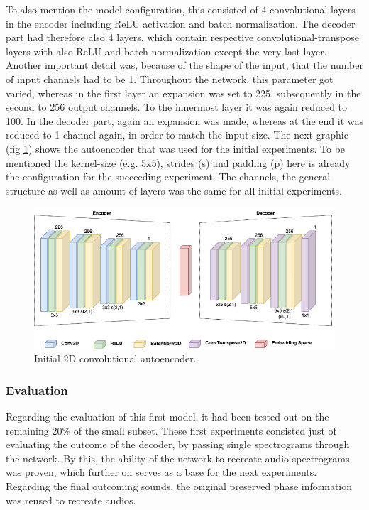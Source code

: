 To also mention the model configuration, this consisted of 4 convolutional layers in the encoder including ReLU activation and batch normalization. The decoder part had therefore also 4 layers, which contain respective convolutional-transpose layers with also ReLU and batch normalization except the very last layer. Another important detail was, because of the shape of the input, that the number of input channels had to be 1. Throughout the network, this parameter got varied, whereas in the first layer an expansion was set to 225, subsequently in the second to 256 output channels. To the innermost layer it was again reduced to 100. In the decoder part, again an expansion was made, whereas at the end it was reduced to 1 channel again, in order to match the input size. The next graphic (fig \ref{fig:cae_2D_init}) shows the autoencoder that was used for the initial experiments. To be mentioned the kernel-size (e.g. 5x5), strides (s) and padding (p) here is already the configuration for the succeeding experiment. The channels, the general structure as well as amount of layers was the same for all initial experiments.

 \begin{figure}[htb!]
	\caption{Initial 2D convolutional autoencoder.}
	\label{fig:cae_2D_init}
	\centering
	\includegraphics[width=\textwidth]{images/experiments/autoencoder_init.png}
\end{figure}

\newpage
\subsubsection{Evaluation}
Regarding the evaluation of this first model, it had been tested out on the remaining 20\% of the small subset. These first experiments consisted just of evaluating the outcome of the decoder, by passing single spectrograms through the network. By this, the ability of the network to recreate audio spectrograms was proven, which further on serves as a base for the next experiments. Regarding the final outcoming sounds, the original preserved phase information was reused to recreate audios.

